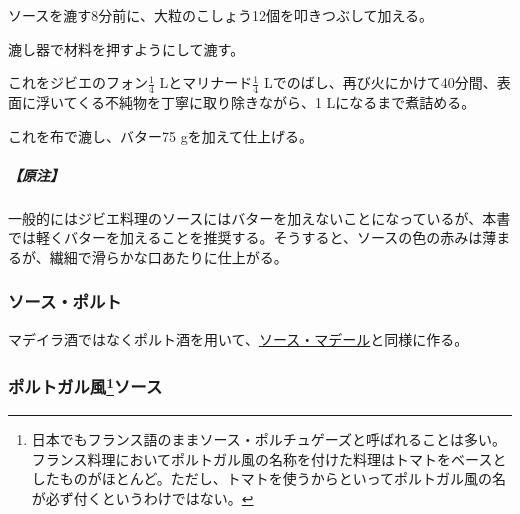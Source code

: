 \begin{recette}
ソースを漉す8分前に、大粒のこしょう12個を叩きつぶして加える。

漉し器で材料を押すようにして漉す。

これをジビエのフォン\(\frac{1}{4}\) Lとマリナード\(\frac{1}{4}\)
Lでのばし、再び火にかけて40分間、表面に浮いてくる不純物を丁寧に取り除きながら、1
Lになるまで煮詰める。

これを布で漉し、バター75 gを加えて仕上げる。

\hypertarget{nota-sauce-poivrade-pour-gibier}{%
\subparagraph{【原注】}\label{nota-sauce-poivrade-pour-gibier}}

一般的にはジビエ料理のソースにはバターを加えないことになっているが、本書では軽くバターを加えることを推奨する。そうすると、ソースの色の赤みは薄まるが、繊細で滑らかな口あたりに仕上がる。

\atoaki{}

\hypertarget{sauce-au-porto}{%
\subsubsection{ソース・ポルト}\label{sauce-au-porto}}


 

マデイラ酒ではなくポルト酒を用いて、\protect\hyperlink{sauce-madere}{ソース・マデール}と同様に作る。

\atoaki{}

\hypertarget{sauce-portugaise}{%
\subsubsection[ポルトガル風ソース]{\texorpdfstring{ポルトガル風\footnote{日本でもフランス語のままソース・ポルチュゲーズと呼ばれることは多い。フランス料理においてポルトガル風の名称を付けた料理はトマトをベースとしたものがほとんど。ただし、トマトを使うからといってポルトガル風の名が必ず付くというわけではない。}ソース}{ポルトガル風ソース}}\label{sauce-portugaise}}




\end{recette}
